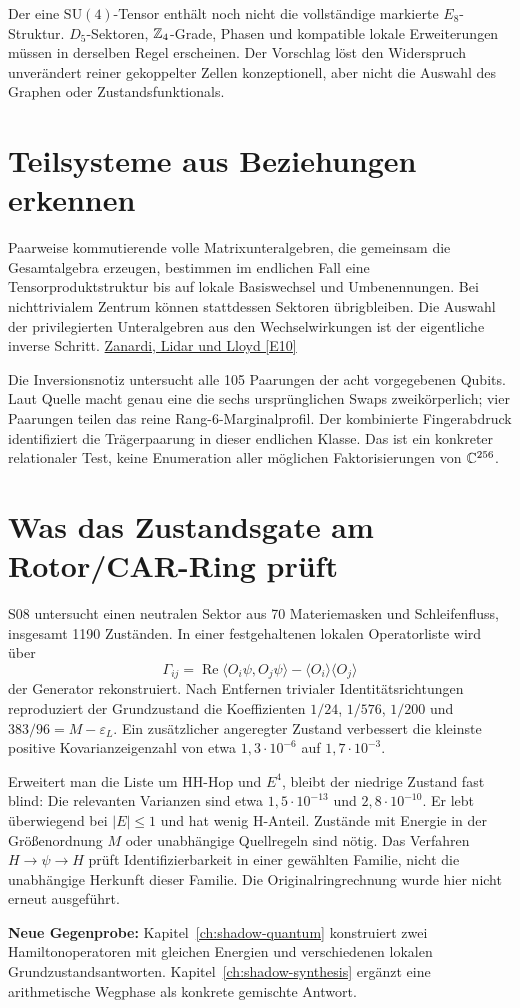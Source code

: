 Der eine $\mathrm{SU}(4)$-Tensor enthält noch nicht die vollständige markierte $E_8$-Struktur. $D_5$-Sektoren, $\mathbb Z_4$-Grade, Phasen und kompatible lokale Erweiterungen müssen in derselben Regel erscheinen. Der Vorschlag löst den Widerspruch unverändert reiner gekoppelter Zellen konzeptionell, aber nicht die Auswahl des Graphen oder Zustandsfunktionals.

\section{Teilsysteme aus Beziehungen erkennen}
Paarweise kommutierende volle Matrixunteralgebren, die gemeinsam die Gesamtalgebra erzeugen, bestimmen im endlichen Fall eine Tensorproduktstruktur bis auf lokale Basiswechsel und Umbenennungen. Bei nichttrivialem Zentrum können stattdessen Sektoren übrigbleiben. Die Auswahl der privilegierten Unteralgebren aus den Wechselwirkungen ist der eigentliche inverse Schritt. \href{https://arxiv.org/abs/quant-ph/0308043}{Zanardi, Lidar und Lloyd [E10]}

Die Inversionsnotiz untersucht alle 105 Paarungen der acht vorgegebenen Qubits. Laut Quelle macht genau eine die sechs ursprünglichen Swaps zweikörperlich; vier Paarungen teilen das reine Rang-6-Marginalprofil. Der kombinierte Fingerabdruck identifiziert die Trägerpaarung in dieser endlichen Klasse. Das ist ein konkreter relationaler Test, keine Enumeration aller möglichen Faktorisierungen von $\mathbb C^{256}$.

\section{Was das Zustandsgate am Rotor/CAR-Ring prüft}
S08 untersucht einen neutralen Sektor aus 70 Materiemasken und Schleifenfluss, insgesamt 1190 Zuständen. In einer festgehaltenen lokalen Operatorliste wird über
\begin{equation}
\Gamma_{ij}=\operatorname{Re}\langle O_i\psi,O_j\psi\rangle
-\langle O_i\rangle\langle O_j\rangle
\end{equation}
der Generator rekonstruiert. Nach Entfernen trivialer Identitätsrichtungen reproduziert der Grundzustand die Koeffizienten $1/24$, $1/576$, $1/200$ und $383/96=M-\varepsilon_L$. Ein zusätzlicher angeregter Zustand verbessert die kleinste positive Kovarianzeigenzahl von etwa $1{,}3\cdot10^{-6}$ auf $1{,}7\cdot10^{-3}$.

Erweitert man die Liste um HH-Hop und $E^4$, bleibt der niedrige Zustand fast blind: Die relevanten Varianzen sind etwa $1{,}5\cdot10^{-13}$ und $2{,}8\cdot10^{-10}$. Er lebt überwiegend bei $|E|\le1$ und hat wenig H-Anteil. Zustände mit Energie in der Größenordnung $M$ oder unabhängige Quellregeln sind nötig. Das Verfahren $H\to\psi\to H$ prüft Identifizierbarkeit in einer gewählten Familie, nicht die unabhängige Herkunft dieser Familie. Die Originalringrechnung wurde hier nicht erneut ausgeführt.

\par\noindent\textbf{Neue Gegenprobe:} Kapitel~\ref{ch:shadow-quantum} konstruiert zwei Hamiltonoperatoren mit gleichen Energien und verschiedenen lokalen Grundzustandsantworten. Kapitel~\ref{ch:shadow-synthesis} ergänzt eine arithmetische Wegphase als konkrete gemischte Antwort.
